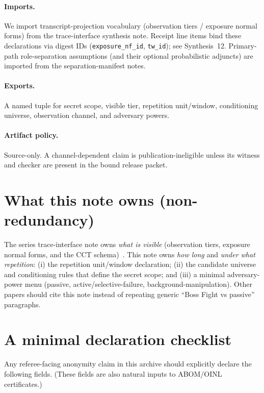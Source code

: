 \documentclass[11pt]{article}
\begin{document}
\paragraph{Imports.}
We import transcript-projection vocabulary (observation tiers / exposure normal forms) from the trace-interface synthesis note.\cite{series:traceifaces}
Receipt line items bind these declarations via digest IDs (\texttt{exposure\_nf\_id}, \texttt{tw\_id}); see Synthesis~12.\cite{series:receiptitems}
Primary-path role-separation assumptions (and their optional probabilistic adjuncts) are imported from the separation-manifest notes.\cite{series:primarysepmanifest,series:probsep}

\paragraph{Exports.}
A named tuple for secret scope, visible tier, repetition unit/window, conditioning universe, observation channel, and adversary powers.

\paragraph{Artifact policy.}
Source-only. A channel-dependent claim is publication-ineligible unless its witness and checker are present in the bound release packet.

\section{What this note owns (non-redundancy)}
The series trace-interface note owns \emph{what is visible} (observation tiers, exposure normal forms, and the CCT schema)~\cite{series:traceifaces}.
This note owns \emph{how long} and \emph{under what repetition}:
(i) the repetition unit/window declaration; (ii) the candidate universe and conditioning rules that define the secret scope; and (iii) a minimal adversary-power menu (passive, active/selective-failure, background-manipulation).
Other papers should cite this note instead of repeating generic ``Boss Fight vs passive'' paragraphs.

\section{A minimal declaration checklist}\label{sec:checklist}
Any referee-facing anonymity claim in this archive should explicitly declare the following fields.
(These fields are also natural inputs to ABOM/OINL certificates.)
\end{document}
